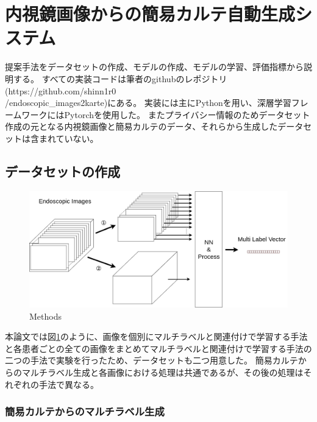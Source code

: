 \section{内視鏡画像からの簡易カルテ自動生成システム}

提案手法をデータセットの作成、モデルの作成、モデルの学習、評価指標から説明する。
すべての実装コードは筆者のgithubのレポジトリ (https://github.com/shinn1r0\\/endoscopic\_images2karte)にある。
実装には主にPythonを用い、深層学習フレームワークにはPytorchを使用した。
またプライバシー情報のためデータセット作成の元となる内視鏡画像と簡易カルテのデータ、それらから生成したデータセットは含まれていない。
\subsection{データセットの作成}
\begin{figure}[tb]
    \begin{center}
        \includegraphics[width=150mm]{./fig/ieice4.png}
        \caption{Methods}
        \label{fig:methods}
    \end{center}
\end{figure}
本論文では図\ref{fig:methods}のように、画像を個別にマルチラベルと関連付けで学習する手法と各患者ごとの全ての画像をまとめてマルチラベルと関連付けで学習する手法の二つの手法で実験を行ったため、データセットも二つ用意した。
簡易カルテからのマルチラベル生成と各画像における処理は共通であるが、その後の処理はそれぞれの手法で異なる。
\subsubsection{簡易カルテからのマルチラベル生成}

